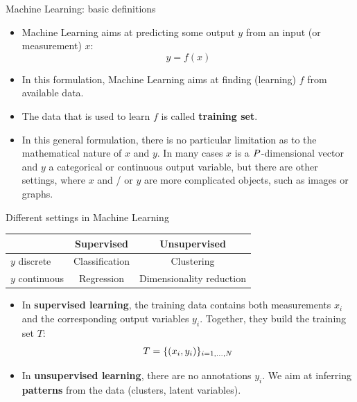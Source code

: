 \documentclass[xcolor=pdftex,dvipsnames,table]{beamer}
\begin{document}
\begin{frame}{Machine Learning: basic definitions}
\begin{itemize}
	\item Machine Learning aims at predicting some output $y$ from an input (or measurement) $x$:
	\begin{equation}
	y = f(x)
	\end{equation}
	\item In this formulation, Machine Learning aims at finding (learning) $f$ from available data. 
	\item The data that is used to learn $f$ is called \textbf{training set}. 
	\item In this general formulation, there is no particular limitation as to the mathematical nature of $x$ and $y$. In many cases $x$ is a $P$-dimensional vector and $y$ a categorical or continuous output variable, but there are other settings, where $x$ and / or $y$ are more complicated objects, such as images or graphs.
\end{itemize}
\end{frame}

\begin{frame}{Different settings in Machine Learning}
	\begin{table}
	\begin{tabular}{|l || c | c | }
		\hline
 		& Supervised & Unsupervised \\
		\hline \hline
		$y$ discrete & Classification & Clustering \\ 
		$y$ continuous & Regression & Dimensionality reduction\\ 
		\hline
	\end{tabular}
	\end{table}
\begin{itemize}
	\item In \textbf{supervised learning}, the training data contains both measurements $x_i$ and the corresponding output variables $y_i$. Together, they build the training set $T$:
	\begin{equation}
	T = \{(x_i, y_i)\}_{i=1, \ldots, N}
	\end{equation}
	\item In \textbf{unsupervised learning}, there are no annotations $y_i$. We aim at inferring \textbf{patterns} from the data (clusters, latent variables). 
\end{itemize}
\end{frame}
\end{document}
